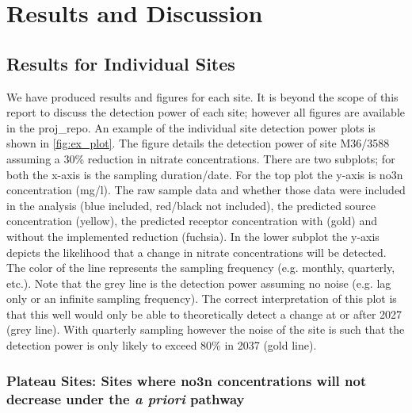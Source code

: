 
\section[Results and Discussion]{Results and Discussion} \label{sec:results}


\subsection[Site results]{Results for Individual Sites} \label{sec:site_results}

We have produced results and figures for each site.  It is beyond the scope of this report to discuss the detection power of each site; however all figures are available in the \gls{proj_repo}. An example of the individual site detection power plots is shown in \autoref{fig:ex_plot}. The figure details the detection power of site M36/3588 assuming a 30\% reduction in nitrate concentrations.  There are two subplots; for both the x-axis is the sampling duration/date. For the top plot the y-axis is \gls{no3n} concentration (mg/l).  The raw sample data and whether those data were included in the analysis (blue included, red/black not included), the predicted source concentration (yellow), the predicted receptor concentration with (gold) and without the implemented reduction (fuchsia). In the lower subplot the y-axis depicts the likelihood that a change in nitrate concentrations will be detected.  The color of the line represents the sampling frequency (e.g. monthly, quarterly, etc.).  Note that the grey line is the detection power assuming no noise (e.g. lag only or an infinite sampling frequency).  The correct interpretation of this plot is that this well would only be able to theoretically detect a change at or after 2027 (grey line).  With quarterly sampling however the noise of the site is such that the detection power is only likely to exceed 80\% in 2037 (gold line).


\subsubsection[Plateau Sites]{Plateau Sites: Sites where \gls{no3n} concentrations will not decrease under the \textit{a priori} pathway} \label{sec:plateau_results}

